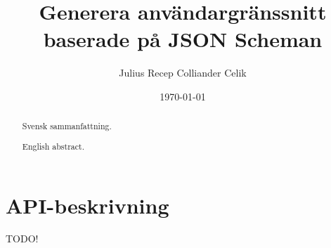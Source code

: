 \documentclass[swedish]{kththesis}
\begin{document}
\title{Generera användargränssnitt baserade på JSON Scheman}
\author{Julius Recep Colliander Celik}
\date{\today}

\frontmatter

\titlepage

\begin{abstract}
  Svensk sammanfattning.

\end{abstract}


\begin{otherlanguage}{english}
  \begin{abstract}
    English abstract.

  \end{abstract}
\end{otherlanguage}


\tableofcontents

\mainmatter







\printbibliography[heading=bibintoc] %

\appendix

\chapter{API-beskrivning}
\label{appendix:api-beskrivning}
TODO!
\end{document}
